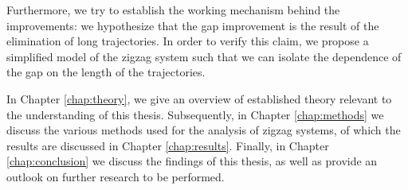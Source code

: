 	Furthermore, we try to establish the working mechanism behind the improvements: we hypothesize that the gap improvement is the result of the elimination of long trajectories.
	In order to verify this claim, we propose a simplified model of the zigzag system such that we can isolate the dependence of the gap on the length of the trajectories.

	In Chapter \ref{chap:theory}, we give an overview of established theory relevant to the understanding of this thesis.
	Subsequently, in Chapter \ref{chap:methods} we discuss the various methods used for the analysis of zigzag systems, of which the results are discussed in Chapter \ref{chap:results}.
	Finally, in Chapter \ref{chap:conclusion} we discuss the findings of this thesis, as well as provide an outlook on further research to be performed.